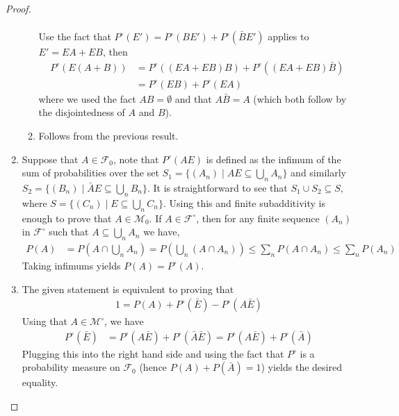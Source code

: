\documentclass[11pt]{article}
\newcommand\br[1]{\left ( #1 \right )}
\newcommand{\F}{\mathcal{F}}
\newcommand{\M}{\mathcal{M}}
\newcommand{\seq}{\subseteq}
\newcommand{\es}{\emptyset}
\newcommand{\un}{\cup}
\newcommand{\ic}{\cap}
\begin{document}
\begin{proof}
\begin{enumerate}
\begin{enumerate}
\begin{align*}
            \end{align*}
            Use the fact that $P^\circ (E') = P^\circ(BE') + P^\circ (\bar{B} E')$ applies to $E' = EA + EB$, then
            \begin{align*}
                P^\circ (E(A +B)) &= P^\circ((EA + EB)B) + P^\circ ((EA + EB) \bar{B}) \\
                &= P^\circ(EB) + P^\circ (EA)
            \end{align*}
            where we used the fact $AB = \es$ and that $A\bar{B} = A$ (which both follow by the disjointedness of $A$ and $B$).
            \item Follows from the previous result.
        \end{enumerate}
        \item Suppose that $A \in \F_0$, note that $P^{\circ} (AE)$ is defined as the infimum of the sum of probabilities over the set $S_1 = \{ (A_n) \mid AE \seq \bigcup_n A_n \}$ and similarly $S_2 = \{ (B_n) \mid \bar{A} E \seq \bigcup_n B_n \}$. It is straightforward to see that $S_1 \un S_2 \seq S$, where $S = \{ (C_n) \mid E \seq \bigcup_n C_n \}$. Using this and finite subadditivity is enough to prove that $A \in \M_0$. If $A \in \F^\circ$, then for any finite sequence $(A_n)$ in $\F^\circ$ such that $A \seq \bigcup_n A_n$ we have,
        \begin{align*}
            P(A) &= P\br{A \ic \bigcup_n A_n} = P\br{\bigcup_n (A \ic A_n)} \leq \sum_n P(A \ic A_n) \leq \sum_n P(A_n)
        \end{align*}
        Taking infimums yields $P(A) = P^\circ (A)$.
        \item The given statement is equivalent to proving that
        \begin{align*}
            1 = P(A) + P^{\circ} (\bar{E}) - P^{\circ} (A \bar{E})
        \end{align*}
        Using that $A \in \M^\circ$, we have
        \begin{align*}
            P^\circ (\bar{E}) &= P^\circ (A \bar{E}) + P^\circ (\bar{A} \bar{E}) = P^\circ (A \bar{E}) + P^\circ (\bar{A})
        \end{align*}
        Plugging this into the right hand side and using the fact that $P^\circ$ is a probability measure on $\F_0$ (hence $P(A) + P(\bar{A}) = 1$) yields the desired equality.
    \end{enumerate}
\end{proof}
\end{document}
